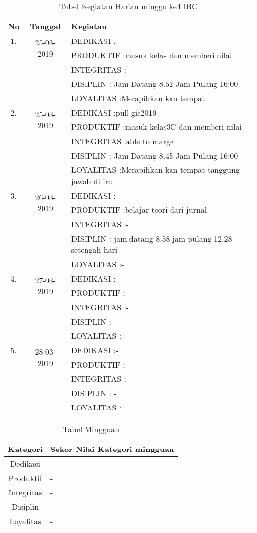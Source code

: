 \begin{table}[h]
\caption{Tabel Kegiatan Harian minggu ke4 IRC}
\centering
\begin{tabular}{|c|c|l|}
\hline
No&Tanggal&Kegiatan\\
\hline
1.&\multirow{2}{*}{25-03-2019}
&DEDIKASI :- \\
&&PRODUKTIF :masuk kelas dan memberi nilai\\
&&INTEGRITAS :-\\
&&DISIPLIN : Jam Datang 8.52 Jam Pulang 16:00\\
&&LOYALITAS :Merapihkan kan tempat\\
\hline
\hline
2.&\multirow{2}{*}{25-03-2019}
&DEDIKASI :pull gis2019 \\
&&PRODUKTIF :masuk kelas3C dan memberi nilai\\
&&INTEGRITAS :able to marge\\
&&DISIPLIN : Jam Datang 8.45 Jam Pulang 16:00\\
&&LOYALITAS :Merapihkan kan tempat tanggung jawab di irc\\
\hline
3.&\multirow{2}{*}{26-03-2019}
&DEDIKASI :- \\
&&PRODUKTIF :belajar teori dari jurnal\\
&&INTEGRITAS :-\\
&&DISIPLIN : jam datang 8.58 jam pulang 12.28 setengah hari\\
&&LOYALITAS :-\\
\hline
4.&\multirow{2}{*}{27-03-2019}
&DEDIKASI :- \\
&&PRODUKTIF :-\\
&&INTEGRITAS :-\\
&&DISIPLIN : -\\
&&LOYALITAS :-\\
\hline
5.&\multirow{2}{*}{28-03-2019}
&DEDIKASI :- \\
&&PRODUKTIF :-\\
&&INTEGRITAS :-\\
&&DISIPLIN : -\\
&&LOYALITAS :-\\
\hline
\end{tabular}
\label{table:contoh}
\end{table}

\begin{table}[h]
\begin{center}
\caption{Tabel Mingguan}
\begin{tabular}{|c|l|}
\hline
Kategori& Sekor Nilai Kategori mingguan\\
\hline
Dedikasi & -\\
\hline
Produktif & -\\
\hline
Integritas & -\\
\hline
Disiplin & -\\
\hline
Loyalitas & -\\
\hline
\end{tabular}
\end{center}
\label {Tabel:contoh} 
\end{table}

